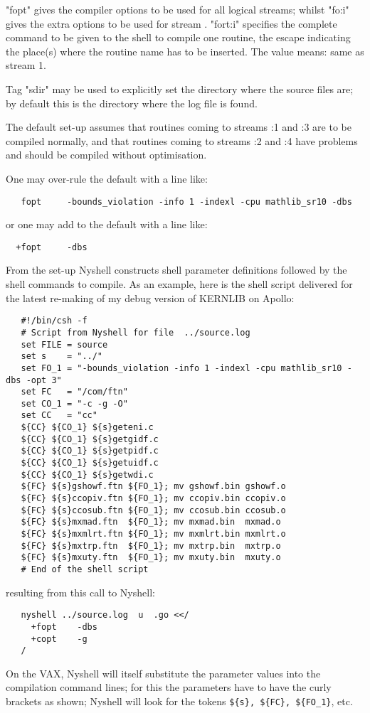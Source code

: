 \begin{enumerate}
"fopt" gives the compiler options to be used for all logical streams;
whilst "fo:i" gives the extra options to be used for stream .
"fort:i" specifies the complete command to be given to the shell to
compile one routine, the escape \Lit{$*} indicating the place(s) where the
routine name has to be inserted.
The value  means: same as stream 1.

Tag "sdir" may be used to explicitly set the directory where the source
files are; by default this is the directory where the log file is found.

The default set-up assumes that   routines coming to streams :1 and :3 are
to be compiled normally, and that routines coming to streams :2 and :4 have
problems and should be compiled without optimisation.

One may over-rule the default with a line like:
\begin{verbatim}
   fopt     -bounds_violation -info 1 -indexl -cpu mathlib_sr10 -dbs
\end{verbatim}
or one may add to the default with a line like:
\begin{verbatim}
  +fopt     -dbs
\end{verbatim}
From the set-up Nyshell constructs shell parameter definitions followed by
the shell commands to compile. As an example, here is the shell script
delivered for the latest re-making of my debug version of KERNLIB on Apollo:
\begin{verbatim}
   #!/bin/csh -f
   # Script from Nyshell for file  ../source.log
   set FILE = source
   set s    = "../"
   set FO_1 = "-bounds_violation -info 1 -indexl -cpu mathlib_sr10 -dbs -opt 3"
   set FC   = "/com/ftn"
   set CO_1 = "-c -g -O"
   set CC   = "cc"
   ${CC} ${CO_1} ${s}geteni.c
   ${CC} ${CO_1} ${s}getgidf.c
   ${CC} ${CO_1} ${s}getpidf.c
   ${CC} ${CO_1} ${s}getuidf.c
   ${CC} ${CO_1} ${s}getwdi.c
   ${FC} ${s}gshowf.ftn ${FO_1}; mv gshowf.bin gshowf.o
   ${FC} ${s}ccopiv.ftn ${FO_1}; mv ccopiv.bin ccopiv.o
   ${FC} ${s}ccosub.ftn ${FO_1}; mv ccosub.bin ccosub.o
   ${FC} ${s}mxmad.ftn  ${FO_1}; mv mxmad.bin  mxmad.o
   ${FC} ${s}mxmlrt.ftn ${FO_1}; mv mxmlrt.bin mxmlrt.o
   ${FC} ${s}mxtrp.ftn  ${FO_1}; mv mxtrp.bin  mxtrp.o
   ${FC} ${s}mxuty.ftn  ${FO_1}; mv mxuty.bin  mxuty.o
   # End of the shell script
\end{verbatim}
resulting from this call to Nyshell:
\begin{verbatim}
   nyshell ../source.log  u  .go <</
     +fopt    -dbs
     +copt    -g
   /
\end{verbatim}
On the VAX, Nyshell will itself substitute the parameter values
into the compilation command lines; for this the parameters have
to have the curly brackets as shown; Nyshell will look for the
tokens \verb!${s}, ${FC}, ${FO_1}!, etc.


\end{enumerate}
